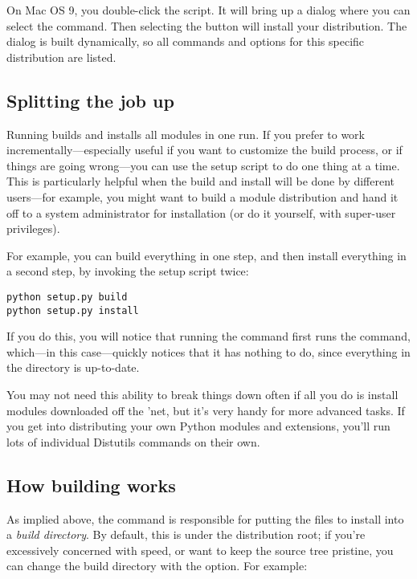 \documentclass{howto}
\begin{document}
On Mac OS 9, you double-click the  script. It will bring
up a dialog where you can select the  command. Then
selecting the  button will install your distribution.
The dialog is built dynamically, so all commands and options for this
specific distribution are listed.

\subsection{Splitting the job up}
\label{splitting-up}

Running  builds and installs all modules in one
run.  If you prefer to work incrementally---especially useful if you
want to customize the build process, or if things are going wrong---you
can use the setup script to do one thing at a time.  This is
particularly helpful when the build and install will be done by
different users---for example, you might want to build a module distribution
and hand it off to a system administrator for installation (or do it
yourself, with super-user privileges).

For example, you can build everything in one step, and then install
everything in a second step, by invoking the setup script twice:

\begin{verbatim}
python setup.py build
python setup.py install
\end{verbatim}

If you do this, you will notice that running the 
command first runs the  command, which---in this
case---quickly notices that it has nothing to do, since everything in
the  directory is up-to-date.

You may not need this ability to break things down often if all you do
is install modules downloaded off the 'net, but it's very handy for more
advanced tasks.  If you get into distributing your own Python modules
and extensions, you'll run lots of individual Distutils commands on
their own.


\subsection{How building works}
\label{how-build-works}

As implied above, the  command is responsible for putting
the files to install into a \emph{build directory}.  By default, this is
 under the distribution root; if you're excessively
concerned with speed, or want to keep the source tree pristine, you can
change the build directory with the  option.
For example:
\end{document}
